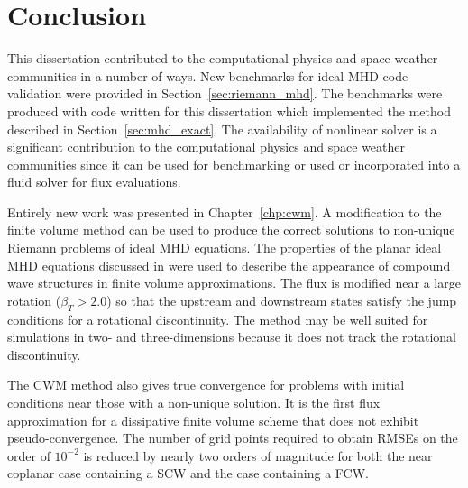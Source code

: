 %
%


\chapter[Conclusion]{Conclusion}
\label{chp:conclusion}

This dissertation contributed to the computational physics and space weather communities in a number of ways.  New benchmarks for ideal MHD code validation were provided in Section~\ref{sec:riemann_mhd}.  The benchmarks were produced with code written for this dissertation which implemented the method described in Section~\ref{sec:mhd_exact}.  The availability of nonlinear solver is a significant contribution to the computational physics and space weather communities since it can be used for benchmarking or used or incorporated into a fluid solver for flux evaluations.  

Entirely new work was presented in Chapter~\ref{chp:cwm}.  A modification to the finite volume method can be used to produce the correct solutions to non-unique Riemann problems of ideal MHD equations.  The properties of the planar ideal MHD equations discussed in \citep{Falle:2001} were used to describe the appearance of compound wave structures in finite volume approximations.  The flux is modified near a large rotation ($\beta_T > 2.0$) so that the upstream and downstream states satisfy the jump conditions for a rotational discontinuity.  The method may be well suited for simulations in two- and three-dimensions because it does not track the rotational discontinuity.

The CWM method also gives true convergence for problems with initial conditions near those with a non-unique solution.  It is the first flux approximation for a dissipative finite volume scheme that does not exhibit pseudo-convergence.  The number of grid points required to obtain RMSEs on the order of $10^{-2}$ is reduced by nearly two orders of magnitude for both the near coplanar case containing a SCW and the case containing a FCW.  

